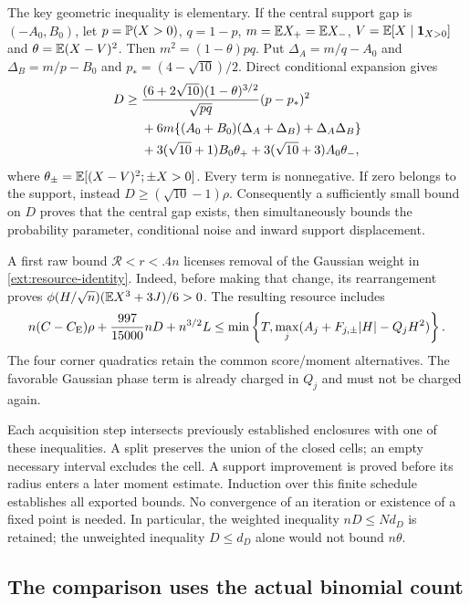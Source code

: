 The key geometric inequality is elementary. If the central support
gap is $(-A_0,B_0)$, let $p=\mathbb P(X>0)$, $q=1-p$,
$m=\mathbb E X_+=\mathbb E X_-$, $V=\mathbb E[X\mid\mathbf1_{X>0}]$ and
$\theta=\mathbb E(X-V)^2$. Then $m^2=(1-\theta)pq$. Put
$\Delta_A=m/q-A_0$ and $\Delta_B=m/p-B_0$ and
$p_*=(4-\sqrt{10})/2$. Direct conditional expansion gives
\begin{align}\label{ext:joint-gap}
 D\ge{}&\frac{(6+2\sqrt{10})(1-\theta)^{3/2}}{\sqrt{pq}}
                      (p-p_*)^2\notag\\
 &+6m\{(A_0+B_0)(\Delta_A+\Delta_B)+\Delta_A\Delta_B\}\notag\\
 &+3(\sqrt{10}+1)B_0\theta_+
       +3(\sqrt{10}+3)A_0\theta_-,
\end{align}
where $\theta_\pm=\mathbb E[(X-V)^2;\pm X>0]$.
Every term is nonnegative. If zero belongs to the support, instead
$D\ge(\sqrt{10}-1)\rho$. Consequently a sufficiently small bound on
$D$ proves that the central gap exists, then simultaneously bounds the
probability parameter, conditional noise and inward support displacement.

A first raw bound $\mathcal R<r<.4n$ licenses removal of the Gaussian
weight in \eqref{ext:resource-identity}. Indeed, before making that
change, its rearrangement proves
$\phi(H/\sqrt n)(\mathbb E X^3+3J)/6>0$. The resulting resource includes
\[
 n(C-C_{\mathrm E})\rho+\frac{997}{15000}nD+n^{3/2}L
 \le\min\left\{T,\max_j(A_j+F_{j,\pm}|H|-Q_jH^2)\right\}.
\]
The four corner quadratics retain the common score/moment alternatives.
The favorable Gaussian phase term is already charged in $Q_j$ and
must not be charged again.

Each acquisition step intersects previously established enclosures with
one of these inequalities. A split preserves the union of the closed
cells; an empty necessary interval excludes the cell. A support
improvement is proved before its radius enters a later moment estimate.
Induction over this finite schedule establishes all exported bounds.
No convergence of an iteration or existence of a fixed point is needed.
In particular, the weighted inequality $nD\le Nd_D$ is retained;
the unweighted inequality $D\le d_D$ alone would not bound $n\theta$.

\subsection{The comparison uses the actual binomial count}

